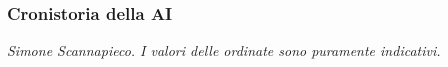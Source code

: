 %
\begin{frame}[t,fragile] \frametitle{Cronistoria della AI}
	\vspace*{-15pt}
	\begin{flushright}
    	\vspace*{-10pt}
        {\tiny\textit{\textcopyright Simone Scannapieco. I valori delle ordinate sono puramente indicativi.}}
	\end{flushright}
\end{frame}
%
